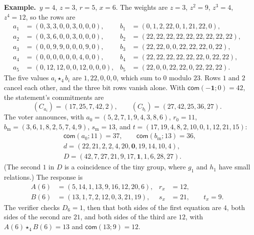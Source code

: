 \documentclass[11pt,a4paper]{article}
\newcommand{\com}{\mathsf{com}}
\newcommand{\ex}[1]{\par\medskip\noindent\textbf{Example.}~#1\par\medskip}
\theoremstyle{remark}
\begin{document}
\ex{$y = 4$, $z = 3$, $r = 5$, $x = 6$. The weights are $z = 3$, $z^2 = 9$,
$z^3 = 4$, $z^4 = 12$, so the rows are
\begin{align*}
  a_1 &= (0,3,3,0,0,3,0,0,0), & b_1 &= (0,1,2,22,0,1,21,22,0),\\
  a_2 &= (0,3,6,0,0,3,0,0,0), & b_2 &= (22,22,22,22,22,22,22,22,22),\\
  a_3 &= (0,0,9,9,0,0,0,9,0), & b_3 &= (22,22,0,0,22,22,22,0,22),\\
  a_4 &= (0,0,0,0,0,0,4,0,0), & b_4 &= (22,22,22,22,22,22,0,22,22),\\
  a_5 &= (0,12,12,0,0,12,0,0,0), & b_5 &= (22,0,0,22,22,0,22,22,22).
\end{align*}
The five values $a_i \star_4 b_i$ are $1, 22, 0, 0, 0$, which sum to $0$
modulo $23$. Rows $1$ and $2$ cancel each other, and the three bit rows
vanish alone. With $\com(-\mathbf{1}; 0) = 42$, the statement's commitments
are
\[
  (C_{a_i}) = (17, 25, 7, 42, 2), \qquad (C_{b_i}) = (27, 42, 25, 36, 27).
\]
The voter announces, with $a_0 = (5,2,7,1,9,4,3,8,6)$, $r_0 = 11$,
$b_{\mathrm{m}} = (3,6,1,8,2,5,7,4,9)$, $s_{\mathrm{m}} = 13$, and $t =
(17,19,4,8,2,10,0,1,12,21,15)$:
\begin{align*}
  &\com(a_0; 11) = 37, \qquad \com(b_{\mathrm{m}}; 13) = 36,\\
  &d = (22,21,2,2,4,20,\mathbf{0},19,14,10,4),\\
  &D = (42,7,27,21,9,17,\mathbf{1},1,6,28,27).
\end{align*}
(The second $1$ in $D$ is a coincidence of the tiny group, where $g_1$ and
$h_1$ have small relations.) The response is
\begin{align*}
  A(6) &= (5,14,1,13,9,16,12,20,6), & r_x &= 12,\\
  B(6) &= (13,1,7,2,12,0,3,21,19), & s_x &= 21, \qquad t_x = 9.
\end{align*}
The verifier checks $D_6 = 1$, then that both sides of the first equation
are $4$, both sides of the second are $21$, and both sides of the third are
$12$, with $A(6) \star_4 B(6) = 13$ and $\com(13; 9) = 12$.}
\end{document}
